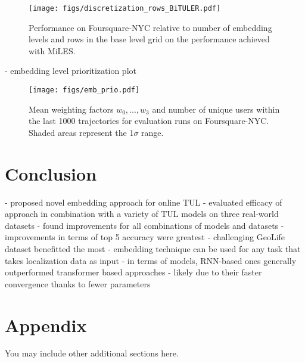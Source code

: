 \documentclass{article} %
\theoremstyle{definition}
\begin{document}
\begin{figure}[h]
    \centering
    \texttt{[image: figs/discretization\_rows\_BiTULER.pdf]}
    \caption{Performance on Foursquare-NYC relative to number of embedding levels and rows in the base level grid on the performance achieved with MiLES.}
    \label{fig:discretization}
\end{figure}
- embedding level prioritization plot

\begin{figure}[h]
    \centering
    \texttt{[image: figs/emb\_prio.pdf]}
    \caption{Mean weighting factors $w_0, ..., w_3$ and number of unique users within the last 1000 trajectories for evaluation runs on Foursquare-NYC. Shaded areas represent the 1$\sigma$ range.}
    \label{fig:emb_prio}
\end{figure}


\section{Conclusion}

- proposed novel embedding approach for online TUL
- evaluated efficacy of approach in combination with a variety of TUL models on three real-world datasets
- found improvements for all combinations of models and datasets
- improvements in terms of top 5 accuracy were greatest
- challenging GeoLife dataset benefitted the most
- embedding technique can be used for any task that takes localization data as input
- in terms of models, RNN-based ones generally outperformed transformer based approaches
- likely due to their faster convergence thanks to fewer parameters




\appendix
\section{Appendix}
You may include other additional sections here.
\end{document}
